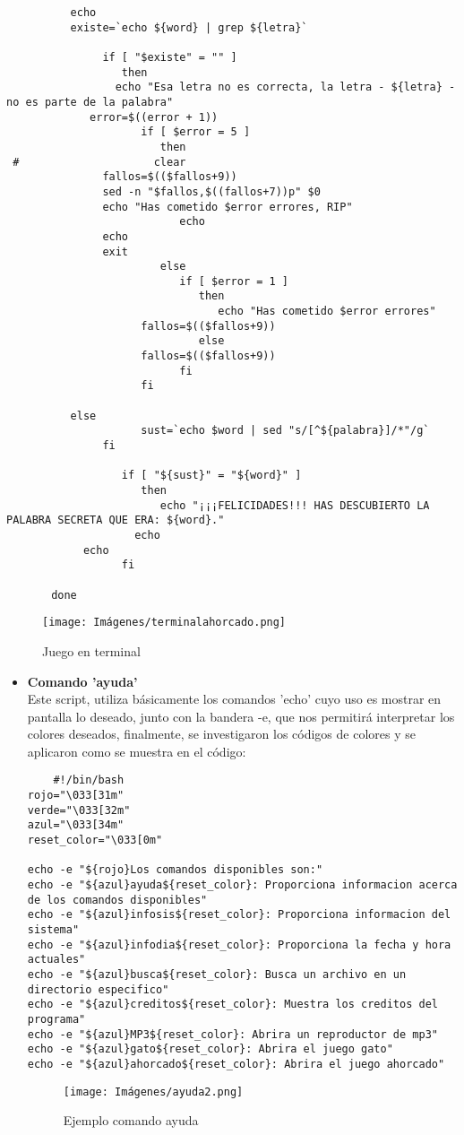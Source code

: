 \documentclass[letterpaper,12pt]{article} %
\begin{document}
\begin{itemize}
\begin{lstlisting}
          echo
          existe=`echo ${word} | grep ${letra}` 
 
               if [ "$existe" = "" ]
                  then
 	             echo "Esa letra no es correcta, la letra - ${letra} - no es parte de la palabra"
 		     error=$((error + 1))
                     if [ $error = 5 ]
                        then
 #	                   clear
 		 	   fallos=$(($fallos+9))
 			   sed -n "$fallos,$((fallos+7))p" $0
 			   echo "Has cometido $error errores, RIP"
                           echo
			   echo	
			   exit
                        else
                           if [ $error = 1 ]
                              then
                                 echo "Has cometido $error errores"
 			         fallos=$(($fallos+9))
                              else
 			         fallos=$(($fallos+9))		
                           fi
                     fi
 
 		  else
                     sust=`echo $word | sed "s/[^${palabra}]/*"/g` 
               fi
 
                  if [ "${sust}" = "${word}" ] 
                     then
                        echo "¡¡¡FELICIDADES!!! HAS DESCUBIERTO LA PALABRA SECRETA QUE ERA: ${word}."
                	echo
 			echo	
                  fi
 
       done
\end{lstlisting}
 \begin{figure}[H]
\caption{Juego en terminal}
\centering
\texttt{[image: Imágenes/terminalahorcado.png]}
\end{figure}
\end{itemize}
\clearpage
\begin{itemize}
\item \textbf{Comando 'ayuda'}\\
    Este script, utiliza básicamente los comandos 'echo' cuyo uso es mostrar en pantalla lo deseado, junto con la bandera -e, que nos permitirá interpretar los colores deseados, finalmente, se investigaron los códigos de colores y se aplicaron como se muestra en el código:
\begin{lstlisting}
    #!/bin/bash
rojo="\033[31m"
verde="\033[32m"
azul="\033[34m"
reset_color="\033[0m"

echo -e "${rojo}Los comandos disponibles son:"
echo -e "${azul}ayuda${reset_color}: Proporciona informacion acerca de los comandos disponibles" 
echo -e "${azul}infosis${reset_color}: Proporciona informacion del sistema" 
echo -e "${azul}infodia${reset_color}: Proporciona la fecha y hora actuales"
echo -e "${azul}busca${reset_color}: Busca un archivo en un directorio especifico"
echo -e "${azul}creditos${reset_color}: Muestra los creditos del programa"
echo -e "${azul}MP3${reset_color}: Abrira un reproductor de mp3"
echo -e "${azul}gato${reset_color}: Abrira el juego gato"
echo -e "${azul}ahorcado${reset_color}: Abrira el juego ahorcado"
\end{lstlisting}
    \begin{figure}[H]
\caption{Ejemplo comando ayuda}
\centering
\texttt{[image: Imágenes/ayuda2.png]}
\end{figure}
\end{itemize}
\end{document}
